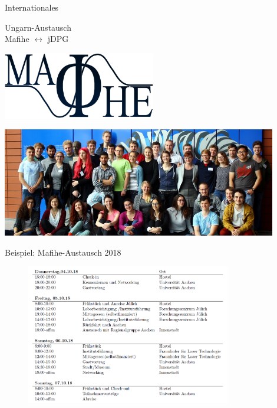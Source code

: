 \documentclass[
]{beamer}
\begin{document}
\begin{frame}{Internationales}
  \begin{minipage}{0.38\textwidth}
    \begin{center}
      Ungarn-Austausch \\ Mafihe $\leftrightarrow$ jDPG
    \end{center}
    \begin{flushleft}
      \includegraphics[width=0.5\textwidth]{figure/mafihelogo4}
    \end{flushleft}
  \end{minipage}
  \begin{minipage}{0.6\textwidth}
    \begin{flushright}
      \includegraphics[width=0.9\textwidth]{figure/mafie_2017}
    \end{flushright}
  \end{minipage}

\end{frame}


\begin{frame}{Beispiel: Mafihe-Austausch 2018}
  \begin{figure}
   \centering
   \includegraphics[width=0.80\textwidth]{figure/programm_mafihe2018}
  \end{figure}
\end{frame}
\end{document}
